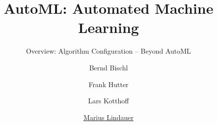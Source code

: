 




\title[AutoML: Overview]{AutoML: Automated Machine Learning}
\subtitle{Overview: Algorithm Configuration -- Beyond AutoML}
\author[Marius Lindauer]{Bernd Bischl \and Frank Hutter \and Lars Kotthoff \and \underline{Marius Lindauer}}
\institute{}
\date{}





	
	\maketitle
	

